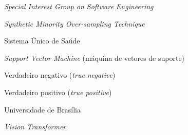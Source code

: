 \begin{siglas}
  \item[SIGSOFT] \textit{Special Interest Group on Software Engineering}
  \item[SMOTE] \textit{Synthetic Minority Over-sampling Technique}
  \item[SUS] Sistema Único de Saúde
  \item[SVM] \textit{Support Vector Machine} (máquina de vetores de suporte)
  \item[TN] Verdadeiro negativo (\textit{true negative})
  \item[TP] Verdadeiro positivo (\textit{true positive})
  \item[UnB] Universidade de Brasília
  \item[ViT] \textit{Vision Transformer}
\end{siglas}
